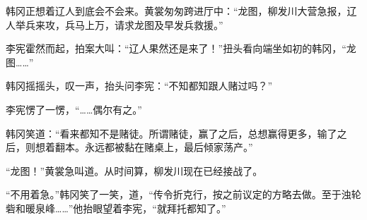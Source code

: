 韩冈正想着辽人到底会不会来。黄裳匆匆跨进厅中：“龙图，柳发川大营急报，辽人举兵来攻，兵马上万，请求龙图及早发兵救援。”

李宪霍然而起，拍案大叫：“辽人果然还是来了！”扭头看向端坐如初的韩冈，“龙图……”

韩冈摇摇头，叹一声，抬头问李宪：“不知都知跟人赌过吗？”

李宪愣了一愣，“……偶尔有之。”

韩冈笑道：“看来都知不是赌徒。所谓赌徒，赢了之后，总想赢得更多，输了之后，则想着翻本。永远都被黏在赌桌上，最后倾家荡产。”

“龙图！”黄裳急叫道。从时间算，柳发川现在已经接战了。

“不用着急。”韩冈笑了一笑，道，“传令折克行，按之前议定的方略去做。至于浊轮砦和暖泉峰……”他抬眼望着李宪，“就拜托都知了。”

